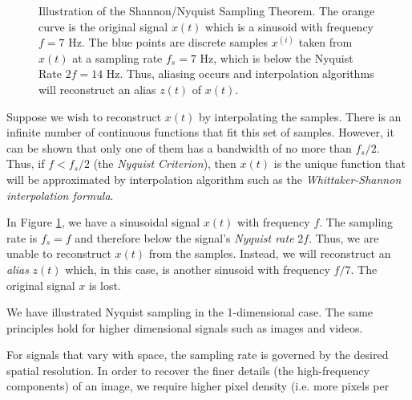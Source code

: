 \begin{figure}
\caption[Illustration of Nyquist Sampling]{Illustration of the Shannon/Nyquist Sampling Theorem. The orange curve is the original signal $x(t)$ which is a sinusoid with frequency $f = 7$ Hz. The blue points are discrete samples $x^{(i)}$ taken from $x(t)$ at a sampling rate $f_s = 7$ Hz, which is below the Nyquist Rate $2f = 14$ Hz. Thus, aliasing occurs and interpolation algorithms will reconstruct an alias $z(t)$ of $x(t)$.}
\label{fig:nyquist}
\end{figure}

Suppose we wish to reconstruct $x(t)$ by interpolating the samples.
There is an infinite number of continuous functions that fit this set of samples.
However, it can be shown that only one of them has a bandwidth of no more than $f_s/2$.
Thus, if $f < f_s/2$ (the \emph{Nyquist Criterion}), then $x(t)$ is the unique function that will be approximated by interpolation algorithm such as the \emph{Whittaker-Shannon interpolation formula}\cite{shannon1949}.

In Figure \ref{fig:nyquist}, we have a sinusoidal signal $x(t)$ with frequency $f$.
The sampling rate is $f_s=f$ and therefore below the signal's \emph{Nyquist rate} $2f$. 
Thus, we are unable to reconstruct $x(t)$ from the samples. 
Instead, we will reconstruct an \emph{alias} $z(t)$ which, in this case, is another sinusoid with frequency $f/7$.
The original signal $x$ is lost.

We have illustrated Nyquist sampling in the 1-dimensional case.
The same principles hold for higher dimensional signals such as images and videos.

For signals that vary with space, the sampling rate is governed by the desired spatial resolution.
In order to recover the finer details (the high-frequency components) of an image, we require higher pixel density (i.e. more pixels per 


